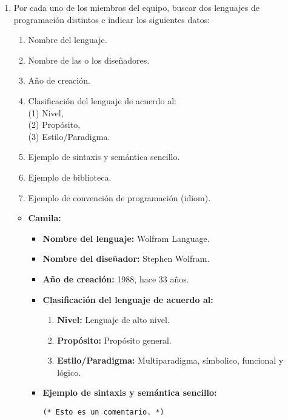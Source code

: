 \documentclass[11pt,letterpaper]{article}
\begin{document}
\begin{enumerate}
    \item Por cada uno de los miembros del equipo, buscar dos lenguajes de
    programación distintos e indicar los siguientes datos:
    \begin{enumerate}[label = (\alph*)]
        \item Nombre del lenguaje.
        \item Nombre de las o los diseñadores.
        \item Año de creación.
        \item Clasificación del lenguaje de acuerdo al: 
        \\(1) Nivel, \\(2) Propósito, \\(3) Estilo/Paradigma.
        \item Ejemplo de sintaxis y semántica sencillo.
        \item Ejemplo de biblioteca.
        \item Ejemplo de convención de programación (idiom).
    \end{enumerate}
        \begin{itemize}
          \item \textbf{Camila:}
                \begin{itemize}
                  \item \textbf{Nombre del lenguaje:} Wolfram Language.
                  \item \textbf{Nombre del diseñador:} Stephen Wolfram.
                  \item \textbf{Año de creación:} 1988, hace 33 años.
                  \item \textbf{Clasificación del lenguaje de acuerdo al:}
                        \begin{enumerate}
                          \item \textbf{Nivel:} Lenguaje de alto nivel.
                          \item \textbf{Propósito:} Propósito general.
                          \item \textbf{Estilo/Paradigma:} Multiparadigma,
                                símbolico, funcional y lógico.
                        \end{enumerate}
                  \item \textbf{Ejemplo de sintaxis y semántica sencillo:}
\begin{verbatim}
(* Esto es un comentario. *)


\end{verbatim}
\end{itemize}
\end{itemize}
\end{enumerate}
\end{document}
